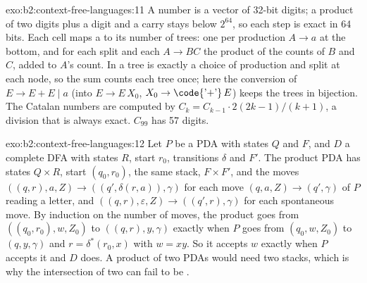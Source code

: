 \begin{solution}{exo:b2:context-free-languages:11}
A number is a vector of 32-bit digits; a product of two digits plus a digit and a carry stays below $2^{64}$, so each
step is exact in 64 bits. Each cell maps a  to its number of trees: one per production $A \to a$ at the
bottom, and for each split and each $A \to BC$ the product of the counts of $B$ and $C$, added to $A$'s count. In
 a tree is exactly a choice of production and split at each node, so the sum counts each tree once;
here the conversion of $E \to E + E \mid a$ (into $E \to E\,X_0$, $X_0 \to \text{\code{'+'}}\,E$) keeps the trees in
bijection. The Catalan numbers are computed by $C_k = C_{k-1} \cdot 2(2k - 1)/(k + 1)$, a division that is always
exact. $C_{99}$ has 57 digits.
\end{solution}

\begin{solution}{exo:b2:context-free-languages:12}
Let $P$ be a PDA with states $Q$ and  $F$, and $D$ a complete DFA with states $R$, start $r_0$,
transitions $\delta$ and  $F'$. The product PDA has states $Q \times R$, start $(q_0, r_0)$, the same
stack,  $F \times F'$, and the moves $((q, r), a, Z) \to ((q', \delta(r, a)), \gamma)$ for each move
$(q, a, Z) \to (q', \gamma)$ of $P$ reading a letter, and $((q, r), \varepsilon, Z) \to ((q', r), \gamma)$ for each
spontaneous move. By induction on the number of moves, the product goes from $((q_0, r_0), w, Z_0)$ to $((q, r), y,
\gamma)$ exactly when $P$ goes from $(q_0, w, Z_0)$ to $(q, y, \gamma)$ and $r = \delta^*(r_0, x)$ with $w = xy$. So
it accepts $w$ exactly when $P$ accepts it and $D$ does. A product of two PDAs would need two stacks, which is why
the intersection of two  can fail to be .
\end{solution}

